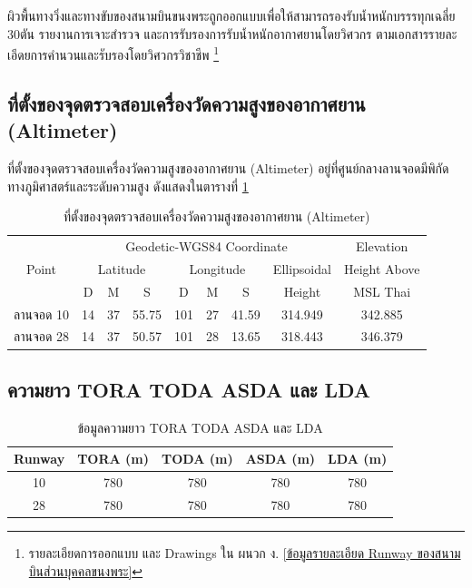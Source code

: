 ผิวพื้นทางวิ่งและทางขับของสนามบินขนงพระถูกออกแบบเพื่อให้สามารถรองรับน้ำหนักบรรรทุกเฉลี่ย 30ตัน
รายงานการเจาะสำรวจ และการรับรองการรับน้ำหนักอากาศยานโดยวิศวกร ตามเอกสารรายละเอีดยการคำนวนและรับรองโดยวิศวกรวิชาชีพ \footnote{รายละเอียดการออกแบบ และ Drawings ใน ผนวก ง. \ref{ข้อมูลรายละเอียด Runway ของสนามบินส่วนบุคคลขนงพระ}}

\subsection{ที่ตั้งของจุดตรวจสอบเครื่องวัดความสูงของอากาศยาน (Altimeter)}

ที่ตั้งของจุดตรวจสอบเครื่องวัดความสูงของอากาศยาน (Altimeter) อยู่ที่ศูนย์กลางลานจอดมีพิกัดทางภูมิศาสตร์และระดับความสูง ดังแสดงในตารางที่ \ref{ที่ตั้งของจุดตรวจสอบเครื่องวัดความสูงของอากาศยาน (Altimeter)}

\begin{table}[h!]
\caption{ที่ตั้งของจุดตรวจสอบเครื่องวัดความสูงของอากาศยาน (Altimeter)}
\begin{center}
\begin{tabular}{|c|c|c|c|c|c|c|c|c|}
\hline
\multirow{3}{*}{Point} & \multicolumn{7}{c|}{Geodetic-WGS84 Coordinate} & Elevation \\ \cline{2-9}
 & \multicolumn{3}{c|}{Latitude} & \multicolumn{3}{c|}{Longitude} & Ellipsoidal & Height Above \\ \cline{2-9}
  & D & M & S & D & M & S & Height & MSL Thai \\
\hline
ลานจอด 10 & 14 & 37 & 55.75 & 101 & 27 & 41.59 & 314.949 & 342.885 \\
ลานจอด 28 & 14 & 37 & 50.57 & 101 & 28 & 13.65 & 318.443 & 346.379 \\
\hline 
\end{tabular}
\end{center}
\label{ที่ตั้งของจุดตรวจสอบเครื่องวัดความสูงของอากาศยาน (Altimeter)}
\end{table}%

\subsection{ความยาว TORA TODA  ASDA และ LDA}

\begin{table}[h!]
\caption{ข้อมูลความยาว TORA TODA  ASDA และ LDA}
\begin{center}
\begin{tabular}{|c|c|c|c|c|}
\hline
Runway & TORA (m) & TODA (m) & ASDA (m) & LDA (m) \\
\hline
10 & 780 & 780 & 780 & 780 \\
28 & 780 & 780 & 780 & 780 \\
\hline
\end{tabular}
\end{center}
\label{ข้อมูลความยาว TORA TODA  ASDA และ LDA}
\end{table}%

